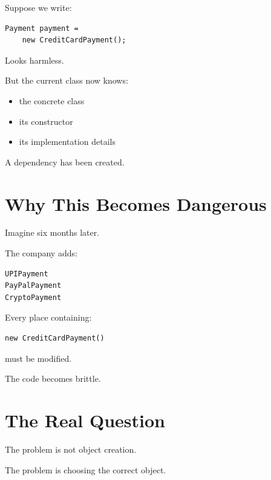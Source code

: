 \documentclass[11pt,a4paper]{book}
\begin{document}
Suppose we write:

\begin{verbatim}
Payment payment =
    new CreditCardPayment();
\end{verbatim}

Looks harmless.

But the current class now knows:

\begin{itemize}

\item the concrete class
\item its constructor
\item its implementation details

\end{itemize}

A dependency has been created.


\section{Why This Becomes Dangerous}

Imagine six months later.

The company adds:

\begin{verbatim}
UPIPayment
PayPalPayment
CryptoPayment
\end{verbatim}

Every place containing:

\begin{verbatim}
new CreditCardPayment()
\end{verbatim}

must be modified.

The code becomes brittle.


\section{The Real Question}

\begin{idea}

The problem is not object creation.

The problem is choosing the correct object.

\end{idea}
\end{document}
